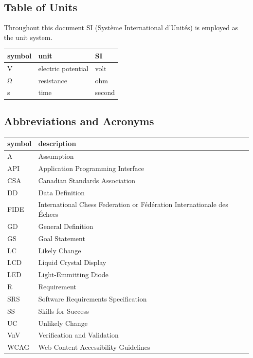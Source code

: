\documentclass[12pt]{article}
\begin{document}
\subsection{Table of Units}
Throughout this document SI (Syst\`{e}me International d'Unit\'{e}s) is employed
as the unit system.

\begin{table}[ht]
  \noindent \begin{tabular}{l l l} 
    \toprule		
    \textbf{symbol} & \textbf{unit} & \textbf{SI}\\
    \midrule 
    \si{\volt} & electric potential & volt\\
    \si{\ohm} & resistance	& ohm\\
    \si{\second} & time & second\\
    \bottomrule
  \end{tabular}
\end{table}

\subsection{Abbreviations and Acronyms}
\begin{tabular}{l l} 
  \toprule		
  \textbf{symbol} & \textbf{description}\\
  \midrule 
  A & Assumption\\
  API & Application Programming Interface\\
  CSA & Canadian Standards Association\\
  DD & Data Definition\\
  FIDE & International Chess Federation or Fédération Internationale des Échecs\\
  GD & General Definition\\
  GS & Goal Statement\\
  LC & Likely Change\\
  LCD & Liquid Crystal Display\\
  LED & Light-Emmitting Diode\\
  R & Requirement\\
  SRS & Software Requirements Specification\\
  SS & Skills for Success\\
  UC & Unlikely Change\\
  VnV & Verification and Validation\\
  WCAG & Web Content Accessibility Guidelines\\
  \bottomrule
\end{tabular}\\
\end{document}
